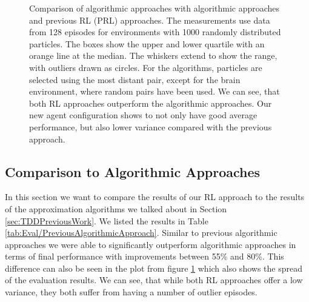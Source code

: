 \begin{figure}[htp]
\begin{center}
    \end{center}
    \caption{Comparison of algorithmic approaches with algorithmic approaches and previous RL (PRL) approaches. The measurements use data from 128 episodes for environments with 1000 randomly distributed particles. The boxes show the upper and lower quartile with an orange line at the median. The whiskers extend to show the range, with outliers drawn as circles. For the algorithms, particles are selected using the most distant pair, except for the brain environment, where random pairs have been used. We can see, that both RL approaches outperform the algorithmic approaches. Our new agent configuration shows to not only have good average performance, but also lower variance compared with the previous approach.} \label{fig:Eval/Baseline/Boxplot}
\end{figure}

\subsection{Comparison to Algorithmic Approaches} \label{sec:EvalAlgorithms}
In this section we want to compare the results of our RL approach to the results of the approximation algorithms we talked about in Section \ref{sec:TDDPreviousWork}. We listed the results in Table \ref{tab:Eval/PreviousAlgorithmicApproach}. Similar to previous algorithmic approaches we were able to significantly outperform algorithmic approaches in terms of final performance with improvements between 55\% and 80\%. This difference can also be seen in the plot from figure \ref{fig:Eval/Baseline/Boxplot} which also shows the spread of the evaluation results. We can see, that while both RL approaches offer a low variance, they both suffer from having a number of outlier episodes. 

